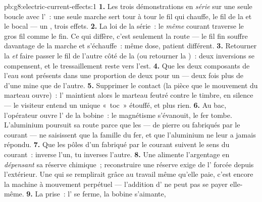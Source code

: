 \begin{solution}{pb:g8:electric-current-effects:1}
\textbf{1.} Les trois démonstrations en \emph{série} sur une seule
boucle avec l'~: une seule marche sert tour à tour le fil
qui chauffe, le fil de la  et le bocal --- un ,
trois effets.
\textbf{2.} La loi de la série~: le \emph{même} courant traverse le
gros fil comme le fin. Ce qui diffère, c'est seulement la route --- le
fil fin souffre davantage de la marche et s'échauffe~: même dose,
patient différent.
\textbf{3.} Retourner la  \emph{et} faire passer le fil de
l'autre côté de la  (ou retourner la )~: deux
inversions se compensent, et le tressaillement reste vers l'est.
\textbf{4.} Que les deux composants de l'eau sont présents dans une
proportion de deux pour un --- deux fois plus de  d'une mine que
de l'autre.
\textbf{5.} Supprimer le contact  (la pièce que le
mouvement du marteau ouvre)~: l' maintient alors le
marteau feutré contre le timbre, en silence --- le visiteur entend un
unique «~toc~» étouffé, et plus rien.
\textbf{6.} Au bac, l'opérateur ouvre l' de la bobine~:
le magnétisme s'évanouit, le fer tombe. L'aluminium poursuit sa route
parce que les  --- de pierre ou fabriqués par le courant --- ne
saisissent que la famille du fer, et que l'aluminium ne leur a jamais
répondu.
\textbf{7.} Que les pôles d'un  fabriqué par le courant suivent
le sens du courant~: inverse l'un, tu inverses l'autre.
\textbf{8.} Une  alimente l'argentage en \emph{dépensant} sa
réserve chimique~; reconstruire une réserve exige de l' forcée
depuis l'extérieur. Une  qui se remplirait grâce au travail
même qu'elle paie, c'est encore la machine à mouvement perpétuel ---
l'addition d' ne peut pas se payer elle-même.
\textbf{9.} La prise~: l' se ferme, la bobine s'aimante,

\end{solution}
